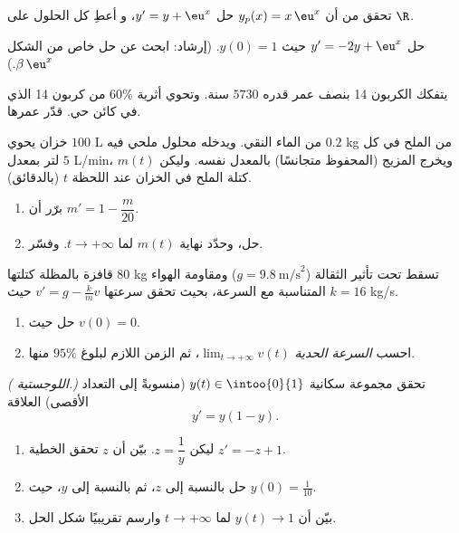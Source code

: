 \begin{exercise}[$\star$]\label{exo:g12:diffeq:3}
تحقق من أن $y_p(x) = x\,\eu^{x}$ حل  $y' = y + \eu^x$، و
أعطِ كل الحلول على $\R$.
\end{exercise}

\begin{exercise}[$\star\star$]\label{exo:g12:diffeq:4}
حل $y' = -2y + \eu^{x}$ حيث $y(0) = 1$.
(إرشاد: ابحث عن حل خاص من الشكل $\beta\,\eu^{x}$.)
\end{exercise}

\begin{exercise}[$\star\star$]\label{exo:g12:diffeq:5}
يتفكك الكربون 14 بنصف عمر قدره $5730$ سنة. وتحوي  أثرية
$60\%$ من كربون 14 الذي في كائن حي. قدّر عمرها.
\end{exercise}

\begin{exercise}[$\star\star$]\label{exo:g12:diffeq:6}
خزان يحوي $100$ L من الماء النقي. ويدخله محلول ملحي فيه $0.2$ kg من الملح في
كل لتر بمعدل $5$ L/min، ويخرج المزيج (المحفوظ متجانسًا) بالمعدل
نفسه. وليكن $m(t)$ كتلة الملح في الخزان عند اللحظة $t$ (بالدقائق).
\begin{enumerate}
  \item برّر أن $m' = 1 - \dfrac{m}{20}$.
  \item حل، وحدّد نهاية $m(t)$ لما $t \to +\infty$.
        وفسّر.
\end{enumerate}
\end{exercise}

\begin{exercise}[$\star\star$]\label{exo:g12:diffeq:7}
قافزة بالمظلة كتلتها $80$ kg تسقط تحت تأثير الثقالة
($g = 9.8\ \text{m/s}^2$) ومقاومة الهواء المتناسبة مع السرعة، بحيث
تحقق سرعتها $v' = g - \frac{k}{m}v$ حيث $k = 16$ kg/s.
\begin{enumerate}
  \item حل  حيث $v(0) = 0$.
  \item احسب \emph{السرعة الحدية} $\lim_{t\to+\infty} v(t)$، ثم
        الزمن اللازم لبلوغ $95\%$ منها.
\end{enumerate}
\end{exercise}

\begin{exercise}[$\star\star\star$]\label{exo:g12:diffeq:8}
\emph{( اللوجستية.)} تحقق مجموعة سكانية $y(t) \in \intoo{0}{1}$ (منسوبةً
إلى التعداد الأقصى) العلاقة
\[
y' = y(1 - y).
\]
\begin{enumerate}
  \item ليكن $z = \dfrac{1}{y}$. بيّن أن $z$ تحقق  الخطية
        $z' = -z + 1$.
  \item حل بالنسبة إلى $z$، ثم بالنسبة إلى $y$، حيث $y(0) = \frac{1}{10}$.
  \item بيّن أن $y(t) \to 1$ لما $t \to +\infty$ وارسم تقريبيًا شكل
         الحل.
\end{enumerate}
\end{exercise}

